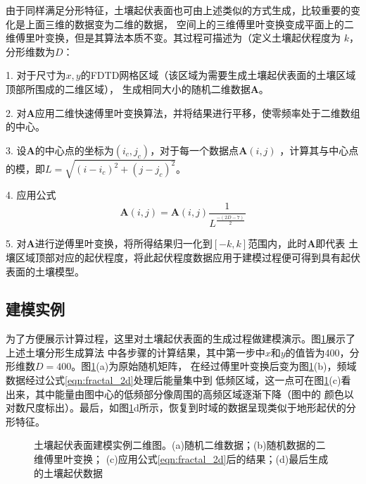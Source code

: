 由于同样满足分形特征，土壤起伏表面也可由上述类似的方式生成，比较重要的变化是上面三维的数据变为二维的数据，
空间上的三维傅里叶变换变成平面上的二维傅里叶变换，但是其算法本质不变。其过程可描述为（定义土壤起伏程度为
$k$，分形维数为$D$：

1. 对于尺寸为$x,y$的FDTD网格区域（该区域为需要生成土壤起伏表面的土壤区域顶部所围成的二维区域），
生成相同大小的随机二维数据$\mathbf{A}$。

2. 对$\mathbf{A}$应用二维快速傅里叶变换算法，并将结果进行平移，使零频率处于二维数组
的中心。

3. 设$\mathbf{A}$的中心点的坐标为$(i_c,j_c)$，对于每一个数据点$\mathbf{A}(i,j)$
，计算其与中心点的模，即$L=\sqrt{(i - i_c)^2 + (j - j_c)^2}$。

4. 应用公式 
\begin{equation}
	\label{eqn:fractal_2d}
	\mathbf{A}(i,j) = \mathbf{A}(i,j) \frac{1}{L^{\frac{-(2 D-7)}{2}}}
\end{equation}

5. 对$\mathbf{A}$进行逆傅里叶变换，将所得结果归一化到$[-k,k]$范围内，此时$\mathbf{A}$即代表
土壤区域顶部对应的起伏程度，将此起伏程度数据应用于建模过程便可得到具有起伏表面的土壤模型。
\subsection{建模实例}
为了方便展示计算过程，这里对土壤起伏表面的生成过程做建模演示。图\ref{rough_surface}展示了上述土壤分形生成算法
中各步骤的计算结果，其中第一步中$x$和$y$的值皆为400，分形维数$D=400$。图\ref{rough_surface}(a)为原始随机矩阵，
在经过傅里叶变换后变为图\ref{rough_surface}(b)，频域数据经过公式\ref{eqn:fractal_2d}处理后能量集中到
低频区域，这一点可在图\ref{rough_surface}(c)看出来，其中能量由图中心的低频部分像周围的高频区域逐渐下降（图中的
颜色以对数尺度标出）。最后，如图\ref{rough_surface}{d}所示，恢复到时域的数据呈现类似于地形起伏的分形特征。
\begin{figure}[htbp]
	\caption{土壤起伏表面建模实例二维图。(a)随机二维数据；(b)随机数据的二维傅里叶变换；
	(c)应用公式\ref{eqn:fractal_2d}后的结果；(d)最后生成的土壤起伏数据}
	\label{rough_surface}
\end{figure}

